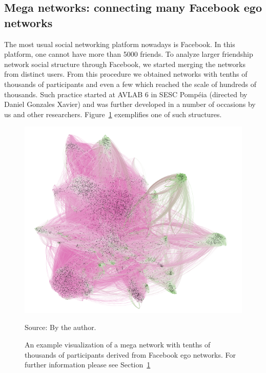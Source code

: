 \begin{apendicesenv}
\section{Mega networks: connecting many Facebook ego networks}\label{sec:megarrede}
The most usual social networking platform nowadays is Facebook.
In this platform, one cannot have more than 5000 friends.
To analyze larger friendship network social structure through Facebook,
we started merging the networks from distinct users.
From this procedure we obtained networks with tenths of thousands of participants
and even a few which reached the scale of hundreds of thousands.
Such practice started at AVLAB 6 in SESC Pompéia (directed by Daniel Gonzales Xavier)
and was further developed in a number of occasions by us and other researchers.
Figure~\ref{fig:megarrede} exemplifies one of such structures.
\begin{figure}[h!]
\begin{center}
\includegraphics[scale=.45]{figs/megarrede}
\caption{An example visualization of a mega network with tenths of thousands of participants derived from Facebook ego networks.
	For further information please see Section~\ref{sec:megarrede}}
\label{fig:megarrede}
\begin{flushleft}\footnotesize
Source: By the author.\
\end{flushleft}
\end{center}
\end{figure}


\end{apendicesenv}
